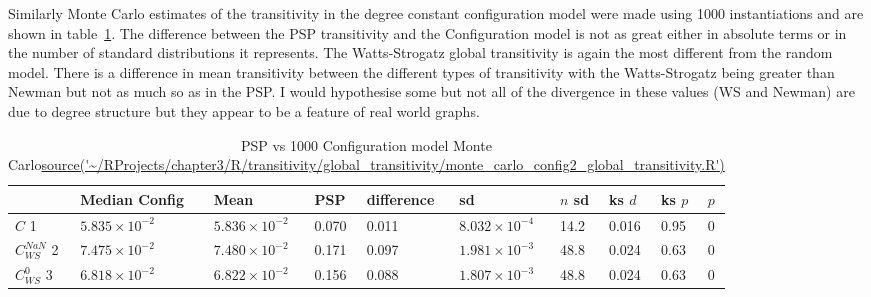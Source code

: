 Similarly Monte Carlo estimates of the transitivity in the degree constant configuration model were made using 1000 instantiations and are shown in table~\ref{tab: MC estimate of config transitivity}. The difference between the PSP transitivity and the Configuration model is not as great either in absolute terms or in the number of standard distributions it represents. The Watts-Strogatz global transitivity is again the most different from the random model. There is a difference in mean transitivity between the different types of transitivity with the Watts-Strogatz being greater than Newman but not as much so as in the PSP. I would hypothesise some but not all of the divergence in these values (WS and Newman) are due to degree structure but they appear to be a feature of real world graphs. 


\begin{table}[ht]
\centering
\begin{adjustbox}{width=\textwidth}


\begin{tabular}{llllllllll}
  \toprule
 & Median Config & Mean & PSP & difference & sd & $n$ sd & ks $d$ & ks $p$ & $p$ \\ 
  \midrule
$C$ 1 & $5.835 \times 10^{-2}$ & $5.836 \times 10^{-2}$ & 0.070 & 0.011 & $8.032 \times 10^{-4}$ & 14.2 & 0.016 & 0.95 & 0 \\ 
   $C_{WS}^{NaN}$ 2 & $7.475 \times 10^{-2}$ & $7.480 \times 10^{-2}$ & 0.171 & 0.097 & $1.981 \times 10^{-3}$ & 48.8 & 0.024 & 0.63 & 0 \\ 
   $C_{WS}^0$ 3 & $6.818 \times 10^{-2}$ & $6.822 \times 10^{-2}$ & 0.156 & 0.088 & $1.807 \times 10^{-3}$ & 48.8 & 0.024 & 0.63 & 0 \\ 
   \bottomrule
\end{tabular}
\end{adjustbox}
\caption{PSP vs 1000 Configuration model Monte Carlo\url{source('~/RProjects/chapter3/R/transitivity/global_transitivity/monte_carlo_config2_global_transitivity.R')}} 
\label{tab: MC estimate of config transitivity}
\end{table}


\cite{newman2003social}
\cite{vasques2020transitivity}



